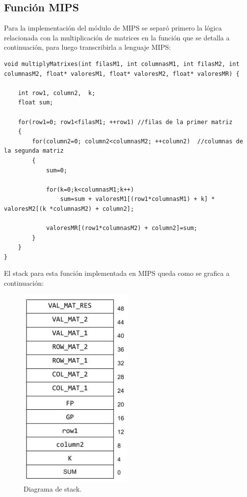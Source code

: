 \documentclass[a4paper,10pt]{article}
\begin{document}
\subsection{Funci\'on MIPS}
Para la implementaci\'on del m\'odulo de MIPS se separ\'o primero la l\'ogica relacionada con la multiplicaci\'on de matrices en la funci\'on que se detalla a continuaci\'on, para luego transcribirla a lenguaje MIPS:
\\
\begin{lstlisting}
void multiplyMatrixes(int filasM1, int columnasM1, int filasM2, int columnasM2, float* valoresM1, float* valoresM2, float* valoresMR) {

	int row1, column2,  k;
	float sum;

	for(row1=0; row1<filasM1; ++row1) //filas de la primer matriz
	{
	    for(column2=0; column2<columnasM2; ++column2)  //columnas de la segunda matriz
	    {
	    	sum=0;

	    	for(k=0;k<columnasM1;k++)
	    		sum=sum + valoresM1[(row1*columnasM1) + k] * valoresM2[(k *columnasM2) + column2];

	    	valoresMR[(row1*columnasM2) + column2]=sum;
	    }
	}
}
\end{lstlisting}

El stack para esta funci\'on implementada en MIPS queda como se grafica a continuaci\'on:

\begin{figure}[htbp]
	    \centering
		\includegraphics[width=0.50\textwidth]{content/stack_tp1.png}
	    \caption{\scriptsize{Diagrama de stack.}}
	    \label{fig003}
      \end{figure}
\end{document}
